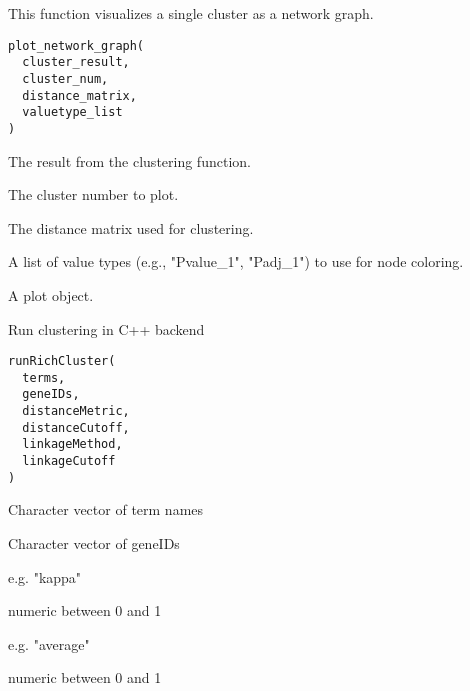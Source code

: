 \documentclass[a4paper]{book}
\begin{document}
%
\begin{Description}
This function visualizes a single cluster as a network graph.
\end{Description}
%
\begin{Usage}
\begin{verbatim}
plot_network_graph(
  cluster_result,
  cluster_num,
  distance_matrix,
  valuetype_list
)
\end{verbatim}
\end{Usage}
%
\begin{Arguments}
\begin{ldescription}
\item[\code{cluster\_result}] The result from the clustering function.

\item[\code{cluster\_num}] The cluster number to plot.

\item[\code{distance\_matrix}] The distance matrix used for clustering.

\item[\code{valuetype\_list}] A list of value types (e.g., "Pvalue\_1", "Padj\_1") to use for node coloring.
\end{ldescription}
\end{Arguments}
%
\begin{Value}
A plot object.
\end{Value}
%
\begin{Description}
Run clustering in C++ backend
\end{Description}
%
\begin{Usage}
\begin{verbatim}
runRichCluster(
  terms,
  geneIDs,
  distanceMetric,
  distanceCutoff,
  linkageMethod,
  linkageCutoff
)
\end{verbatim}
\end{Usage}
%
\begin{Arguments}
\begin{ldescription}
\item[\code{terms}] Character vector of term names

\item[\code{geneIDs}] Character vector of geneIDs

\item[\code{distanceMetric}] e.g. "kappa"

\item[\code{distanceCutoff}] numeric between 0 and 1

\item[\code{linkageMethod}] e.g. "average"

\item[\code{linkageCutoff}] numeric between 0 and 1
\end{ldescription}
\end{Arguments}
\end{document}
